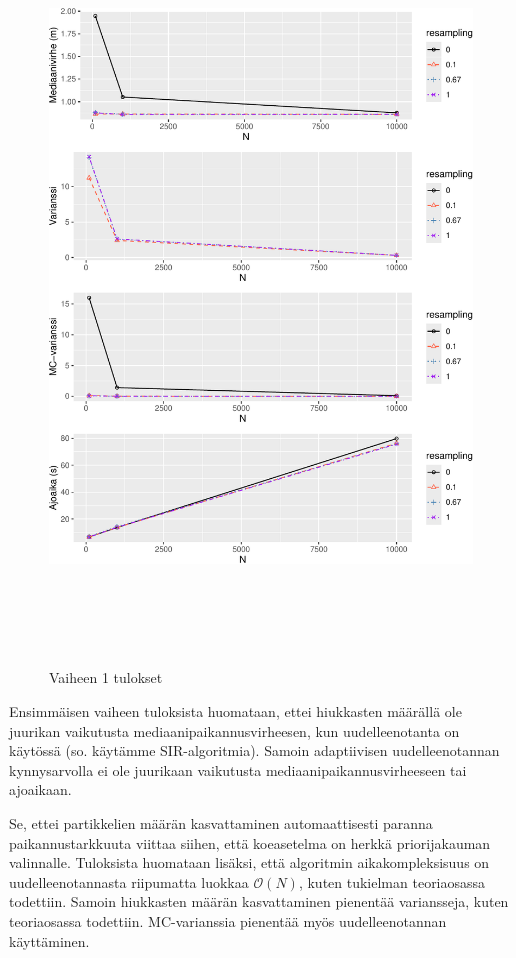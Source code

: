 \documentclass[
  12pt,
  a4paper, twoside]{book}
\begin{document}
\begin{figure}

{\centering \includegraphics[width=15cm,height=20cm]{output/figures/phase1-results-1} 

}

\caption{Vaiheen 1 tulokset}\label{fig:phase1-results}
\end{figure}

Ensimmäisen vaiheen tuloksista huomataan, ettei hiukkasten määrällä ole juurikan vaikutusta mediaanipaikannusvirheesen, kun uudelleenotanta on käytössä (so. käytämme SIR-algoritmia). Samoin adaptiivisen uudelleenotannan kynnysarvolla ei ole juurikaan vaikutusta mediaanipaikannusvirheeseen tai ajoaikaan.

Se, ettei partikkelien määrän kasvattaminen automaattisesti paranna paikannustarkkuuta viittaa siihen, että koeasetelma on herkkä priorijakauman valinnalle. Tuloksista huomataan lisäksi, että algoritmin aikakompleksisuus on uudelleenotannasta riipumatta luokkaa \(\mathcal{O}(N)\), kuten tukielman teoriaosassa todettiin. Samoin hiukkasten määrän kasvattaminen pienentää variansseja, kuten teoriaosassa todettiin. MC-varianssia pienentää myös uudelleenotannan käyttäminen.
\end{document}
